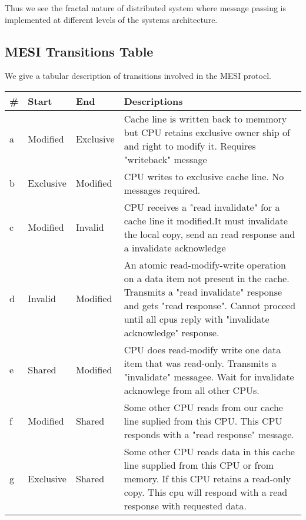 \documentclass{article}
\begin{document}
Thus we see the fractal nature of distributed system where message
passing is implemented at different levels of the systems
architecture.


\subsection{MESI Transitions Table}

We give a tabular description of transitions involved in the MESI
protocl.



\begin{tabular*}{0.75\textwidth} {| l | l | l | p{5cm}| }    
    \hline
    \# & Start  & End   & Descriptions \\
    \hline
    a & Modified  & Exclusive &
    Cache line is written back to memmory but CPU retains exclusive 
    owner ship of and right to modify it. Requires "writeback" 
    message\\
    \hline
    b& Exclusive & Modified &  
    CPU writes to exclusive cache line. No messages required. \\
    \hline
    c & Modified & Invalid &   
    CPU receives a "read invalidate" for a cache line it modified.It 
    must invalidate the local copy, send an read response and a 
    invalidate acknowledge \\
    \hline
    d & Invalid & Modified &
    An atomic read-modify-write operation on a data item not present
    in the cache. Transmits a "read invalidate" response and gets
    "read response". Cannot proceed until all cpus reply with
    "invalidate acknowledge" response.    \\

    \hline
    e & Shared & Modified & 

    CPU does read-modify write one data item that was
    read-only. Transmits a "invalidate" messagee. Wait for invalidate
    acknowlege from all other CPUs.    
    \\
    \hline
    f & Modified & Shared &

    Some other CPU reads from our cache line suplied from this
    CPU. This CPU responds with a "read response" message.    
    \\    
    \hline

    g & Exclusive & Shared & 


    Some other CPU reads data in this cache line supplied from this
    CPU or from memory. If this CPU retains a read-only copy. This cpu
    will respond with a read response with requested data.
    

\end{tabular*}
\end{document}
